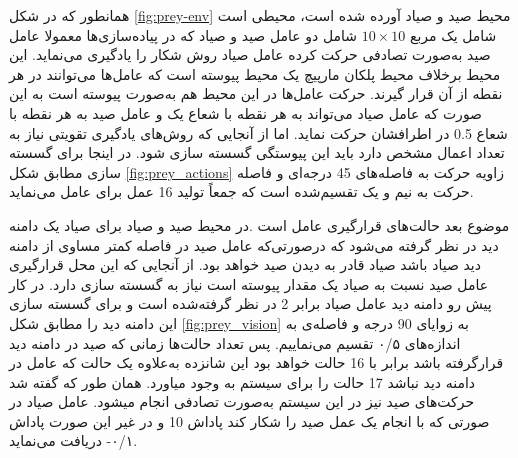 همانطور که در شکل \ref{fig:prey-env} محیط صید و صیاد آورده شده است، محیطی است شامل یک مربع $10\times 10$ شامل دو عامل صید و صیاد که در پیاده‌سازی‌ها معمولا عامل صید به‌صورت تصادفی حرکت کرده عامل صیاد روش شکار را یادگیری می‌نماید. این محیط برخلاف محیط پلکان مارپیچ یک محیط پیوسته است که عامل‌ها می‌توانند در هر نقطه از آن قرار گیرند. حرکت عامل‌ها در این محیط هم به‌صورت پیوسته است به این صورت که عامل صیاد می‌تواند به هر نقطه با شعاع یک و عامل صید به هر نقطه با شعاع 0.5 در اطرافشان حرکت نماید. اما از آنجایی که روش‌های یادگیری تقویتی نیاز به تعداد اعمال مشخص دارد باید این پیوستگی گسسته سازی شود. در اینجا برای گسسته سازی مطابق شکل \ref{fig:prey_actions} زاویه حرکت به فاصله‌های 45 درجه‌ای و فاصله حرکت به نیم و یک تقسیم‌شده است که جمعاً تولید 16 عمل برای عامل می‌نماید.

موضوع بعد حالت‌های قرارگیری عامل است .در محیط صید و صیاد برای صیاد یک دامنه دید در نظر گرفته می‌شود که درصورتی‌که عامل صید در فاصله کمتر مساوی از دامنه دید صیاد باشد صیاد قادر به دیدن صید خواهد بود. از آنجایی که این محل  قرارگیری عامل صید نسبت به صیاد یک مقدار پیوسته است نیاز به گسسته سازی دارد. در کار پیش رو دامنه دید عامل صیاد برابر 2 در نظر گرفته‌شده است و برای گسسته سازی این دامنه دید را مطابق شکل \ref{fig:prey_vision} به زوایای 90 درجه و فاصله‌ی به ‌اندازه‌های ۰/۵ تقسیم می‌نماییم. پس تعداد حالت‌ها زمانی که صید در دامنه دید قرارگرفته باشد برابر با 16 حالت خواهد بود این شانزده به‌علاوه یک حالت که عامل در دامنه دید نباشد 17 حالت را برای سیستم به وجود میاورد. همان طور که گفته شد حرکت‌های صید نیز در این سیستم به‌صورت تصادفی انجام میشود. عامل صیاد در صورتی که با انجام یک عمل صید را شکار کند پاداش 10 و در غیر این صورت پاداش  ۰/۱- دریافت می‌نماید.


